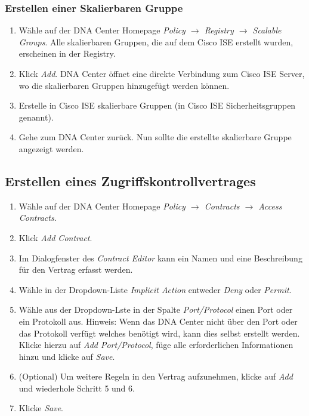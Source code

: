 \subsubsection{Erstellen einer Skalierbaren Gruppe}
\begin{enumerate}
	\item Wähle auf der DNA Center Homepage \textit{Policy $\rightarrow$ Registry $\rightarrow$ Scalable Groups}. Alle skalierbaren Gruppen, die auf dem Cisco ISE erstellt wurden, erscheinen in der Registry.
	\item Klick \textit{Add}. DNA Center öffnet eine direkte Verbindung zum Cisco ISE Server, wo die skalierbaren Gruppen hinzugefügt werden können.
	\item Erstelle in Cisco ISE skalierbare Gruppen (in Cisco ISE Sicherheitsgruppen genannt).
	\item Gehe zum DNA Center zurück. Nun sollte die erstellte skalierbare Gruppe angezeigt werden.
\end{enumerate}

\subsection{Erstellen eines Zugriffskontrollvertrages}
\begin{enumerate}
	\item Wähle auf der DNA Center Homepage \textit{Policy $\rightarrow$ Contracts $\rightarrow$ Access Contracts}.
	\item Klick \textit{Add Contract}.
	\item Im Dialogfenster des \textit{Contract Editor} kann ein Namen und eine Beschreibung für den Vertrag erfasst werden.
	\item Wähle in der Dropdown-Liste \textit{Implicit Action} entweder \textit{Deny} oder \textit{Permit}.
	\item Wähle aus der Dropdown-Lste in der Spalte \textit{Port/Protocol} einen Port oder ein Protokoll aus. Hinweis: Wenn das DNA Center nicht über den Port oder das Protokoll verfügt welches benötigt wird, kann dies selbst erstellt werden. Klicke hierzu auf \textit{Add Port/Protocol}, füge alle erforderlichen Informationen hinzu und klicke auf \textit{Save}.
	\item (Optional) Um weitere Regeln in den Vertrag aufzunehmen, klicke auf \textit{Add} und wiederhole Schritt 5 und 6.
	\item Klicke \textit{Save}.
\end{enumerate}

